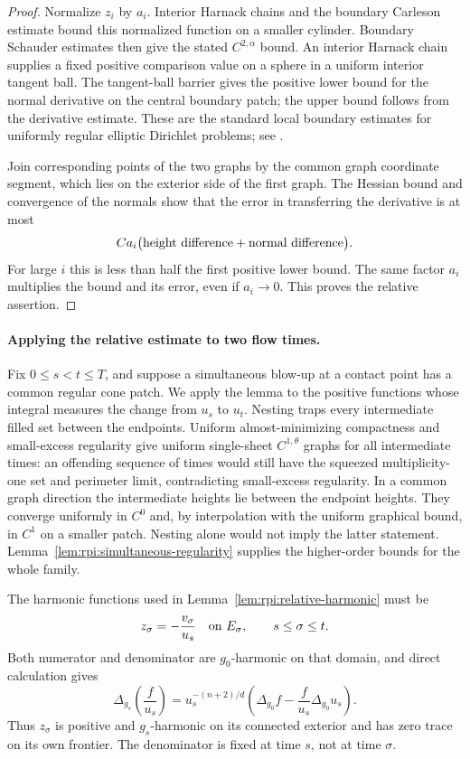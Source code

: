 \begin{proof}
Normalize $z_i$ by $a_i$. Interior Harnack chains and the boundary
Carleson estimate bound this normalized function on a smaller cylinder.
Boundary Schauder estimates then give the stated $C^{2,\alpha}$ bound.
An interior Harnack chain supplies a fixed positive comparison value
on a sphere in a uniform interior tangent ball. The tangent-ball
barrier gives the positive lower bound for the normal derivative on
the central boundary patch; the upper bound follows from the derivative
estimate. These are the standard local boundary estimates for uniformly
regular elliptic Dirichlet problems; see \cite{GilbargTrudinger}.

Join corresponding points of the two graphs by the common graph
coordinate segment, which lies on the exterior side of the first
graph. The Hessian bound and convergence of the normals show that
the error in transferring the derivative is at most
\[
 C a_i\bigl(\hbox{height difference}+\hbox{normal difference}\bigr).
\]
For large $i$ this is less than half the first positive lower bound.
The same factor $a_i$ multiplies the bound and its error, even if
$a_i\to0$. This proves the relative assertion.
\end{proof}

\paragraph{Applying the relative estimate to two flow times.}
Fix $0\le s<t\le T$, and suppose a simultaneous blow-up at a
contact point has a common regular cone patch. We apply the lemma to
the positive functions whose integral measures the change from $u_s$
to $u_t$. Nesting
traps every intermediate filled set between the endpoints. Uniform
almost-minimizing compactness and small-excess regularity give uniform
single-sheet $C^{1,\theta}$ graphs for all intermediate times: an
offending sequence of times would still have the squeezed
multiplicity-one set and perimeter limit, contradicting small-excess
regularity. In a common graph direction the intermediate heights lie
between the endpoint heights. They converge uniformly in $C^0$ and,
by interpolation with the uniform graphical bound, in $C^1$ on a
smaller patch. Nesting alone would not imply the latter statement.
Lemma~\ref{lem:rpi:simultaneous-regularity} supplies the higher-order
bounds for the whole family.

The harmonic functions used in
Lemma~\ref{lem:rpi:relative-harmonic} must be
\begin{equation}\label{eq:rpi:relative-integrands}
 z_\sigma=-\frac{v_\sigma}{u_s}\quad\hbox{on }E_\sigma,
 \qquad s\le\sigma\le t.
\end{equation}
Both numerator and denominator are $g_0$-harmonic on that domain, and
direct calculation gives
\[
 \Delta_{g_s}\left(\frac{f}{u_s}\right)
 =u_s^{-(n+2)/d}
       \left(\Delta_{g_0}f-\frac{f}{u_s}\Delta_{g_0}u_s\right).
\]
Thus $z_\sigma$ is positive and $g_s$-harmonic on its connected
exterior and has zero trace on its own frontier. The denominator is
fixed at time $s$, not at time $\sigma$.

